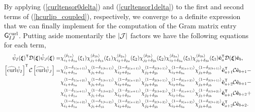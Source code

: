 By applying (\ref{curltensor0delta}) and (\ref{curltensor1delta}) to the first and second terms of (\ref{hcurlip_coupled}), respectively, we converge to a definite expression that we can finally implement for the computation of the Gram matrix entry $\mathsf{G}^{\operatorname{curl}}_{IJ}$. Putting aside momentarily the $|\mathcal{J}|$ factors we have the following equations for each term,
%
\begin{align}
    \hat{\psi}_I(\boldsymbol{\xi})^{\mathsf{T}}\mathcal{D}(\boldsymbol{\xi})\hat{\psi}_J(\boldsymbol{\xi})=&
    \chi_{i_1+\delta_{1a}}^{\langle\delta_{1a}\rangle}(\xi_1)\chi_{j_1+\delta_{1b}}^{\langle\delta_{1b}\rangle}(\xi_1) \chi_{i_2+\delta_{2a}}^{\langle\delta_{2a}\rangle}(\xi_2)\chi_{j_2+\delta_{2b}}^{\langle\delta_{2b}\rangle}(\xi_2) \chi_{i_3+\delta_{3a}}^{\langle\delta_{3a}\rangle}(\xi_3)\chi_{j_3+\delta_{3b}}^{\langle\delta_{3b}\rangle}(\xi_3)
    \hat{\mathbf{e}}_a^{\mathsf{T}}\mathcal{D}(\boldsymbol{\xi})\hat{\mathbf{e}}_b,
    \label{hcurlip_decoupled0}\\
    \left[\widehat{\operatorname{curl}}\hat{\psi}_I\right]^{\mathsf{T}}\mathcal{C}\left[\widehat{\operatorname{curl}}\hat{\psi}_J\right]=&     
    \chi_{i_1+\delta_{1a}}^{\langle1-\delta_{1(a+1)}\rangle} \chi_{j_1+\delta_{1b}}^{\langle1-\delta_{1(b+1)}\rangle}  \chi_{i_2+\delta_{2a}}^{\langle1-\delta_{2(a+1)}\rangle} \chi_{j_2+\delta_{2b}}^{\langle1-\delta_{2(b+1)}\rangle}  \chi_{i_3+\delta_{3a}}^{\langle1-\delta_{3(a+1)}\rangle} \chi_{j_3+\delta_{3b}}^{\langle1-\delta_{3(b+1)}\rangle}
    \hat{\mathbf{e}}_{a+1}^{\mathsf{T}}\mathcal{C}\hat{\mathbf{e}}_{b+1}-\nonumber\\* &
    \chi_{i_1+\delta_{1a}}^{\langle1-\delta_{1(a+2)}\rangle} \chi_{j_1+\delta_{1b}}^{\langle1-\delta_{1(b+1)}\rangle}  \chi_{i_2+\delta_{2a}}^{\langle1-\delta_{2(a+2)}\rangle} \chi_{j_2+\delta_{2b}}^{\langle1-\delta_{2(b+1)}\rangle}  \chi_{i_3+\delta_{3a}}^{\langle1-\delta_{3(a+2)}\rangle} \chi_{j_3+\delta_{3b}}^{\langle1-\delta_{3(b+1)}\rangle}
    \hat{\mathbf{e}}_{a+2}^{\mathsf{T}}\mathcal{C}\hat{\mathbf{e}}_{b+1}-\nonumber\\* &
    \chi_{i_1+\delta_{1a}}^{\langle1-\delta_{1(a+1)}\rangle} \chi_{j_1+\delta_{1b}}^{\langle1-\delta_{1(b+2)}\rangle}  \chi_{i_2+\delta_{2a}}^{\langle1-\delta_{2(a+1)}\rangle} \chi_{j_2+\delta_{2b}}^{\langle1-\delta_{2(b+2)}\rangle}  \chi_{i_3+\delta_{3a}}^{\langle1-\delta_{3(a+1)}\rangle} \chi_{j_3+\delta_{3b}}^{\langle1-\delta_{3(b+2)}\rangle}
    \hat{\mathbf{e}}_{a+1}^{\mathsf{T}}\mathcal{C}\hat{\mathbf{e}}_{b+2}+\nonumber\\* &
    \chi_{i_1+\delta_{1a}}^{\langle1-\delta_{1(a+2)}\rangle} \chi_{j_1+\delta_{1b}}^{\langle1-\delta_{1(b+2)}\rangle} \chi_{i_2+\delta_{2a}}^{\langle1-\delta_{2(a+2)}\rangle} \chi_{j_2+\delta_{2b}}^{\langle1-\delta_{2(b+2)}\rangle} \chi_{i_3+\delta_{3a}}^{\langle1-\delta_{3(a+2)}\rangle} \chi_{j_3+\delta_{3b}}^{\langle1-\delta_{3(b+2)}\rangle}
    \hat{\mathbf{e}}_{a+2}^{\mathsf{T}}\mathcal{C}\hat{\mathbf{e}}_{b+2}.
    \label{hcurlip_decoupled1}    
\end{align}

